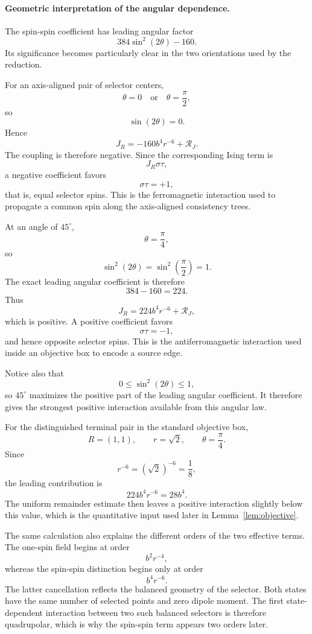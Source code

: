\documentclass[12pt,a4paper]{article}
\begin{document}
\paragraph{Geometric interpretation of the angular dependence.}

The spin-spin coefficient has leading angular factor
\[
384\sin^2(2\theta)-160.
\]
Its significance becomes particularly clear in the two orientations
used by the reduction.

For an axis-aligned pair of selector centers,
\[
\theta=0
\quad\text{or}\quad
\theta=\frac{\pi}{2},
\]
so
\[
\sin(2\theta)=0.
\]
Hence
\[
J_R
=
-160b^4r^{-6}
+
\mathcal R_J.
\]
The coupling is therefore negative.  Since the corresponding Ising
term is
\[
J_R\sigma\tau,
\]
a negative coefficient favors
\[
\sigma\tau=+1,
\]
that is, equal selector spins.  This is the ferromagnetic interaction
used to propagate a common spin along the axis-aligned consistency
trees.

At an angle of $45^\circ$,
\[
\theta=\frac{\pi}{4},
\]
so
\[
\sin^2(2\theta)
=
\sin^2\left(\frac{\pi}{2}\right)
=
1.
\]
The exact leading angular coefficient is therefore
\[
384-160=224.
\]
Thus
\[
J_R
=
224b^4r^{-6}
+
\mathcal R_J,
\]
which is positive.  A positive coefficient favors
\[
\sigma\tau=-1,
\]
and hence opposite selector spins.  This is the antiferromagnetic
interaction used inside an objective box to encode a source edge.

Notice also that
\[
0\le\sin^2(2\theta)\le1,
\]
so $45^\circ$ maximizes the positive part of the leading angular
coefficient.  It therefore gives the strongest positive interaction
available from this angular law.

For the distinguished terminal pair in the standard objective box,
\[
R=(1,1),
\qquad
r=\sqrt2,
\qquad
\theta=\frac{\pi}{4}.
\]
Since
\[
r^{-6}=(\sqrt2)^{-6}=\frac18,
\]
the leading contribution is
\[
224b^4r^{-6}
=
28b^4.
\]
The uniform remainder estimate then leaves a positive interaction
slightly below this value, which is the quantitative input used later
in Lemma~\ref{lem:objective}.

The same calculation also explains the different orders of the two
effective terms.  The one-spin field begins at order
\[
b^2r^{-4},
\]
whereas the spin-spin distinction begins only at order
\[
b^4r^{-6}.
\]
The latter cancellation reflects the balanced geometry of the
selector.  Both states have the same number of selected points and
zero dipole moment.  The first state-dependent interaction between
two such balanced selectors is therefore quadrupolar, which is why
the spin-spin term appears two orders later.
\end{document}
